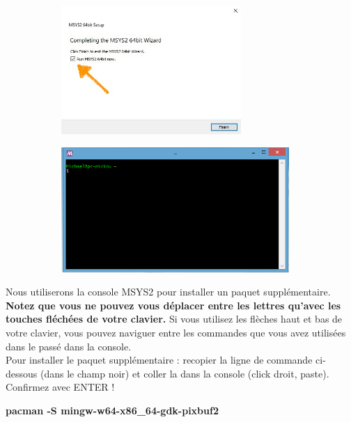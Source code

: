 \documentclass{article}
\begin{document}
\begin{figure}[H]
\begin{subfigure}[c]{0.5\textwidth}
\includegraphics[width=0.75\textwidth]{Plots/AutoInstall6.jpeg}
\end{subfigure}
\begin{subfigure}[c]{0.5\textwidth}
\includegraphics[width=0.95\textwidth]{Plots/Msys2_6Terminal.png}
\end{subfigure}
\end{figure}
Nous utiliserons la console MSYS2 pour installer un paquet supplémentaire. \textbf{Notez que vous ne pouvez vous déplacer entre les lettres qu'avec les touches fléchées de votre clavier. } Si vous utilisez les flèches haut et bas de votre clavier, vous pouvez naviguer entre les commandes que vous avez utilisées dans le passé dans la console.\\

Pour installer le paquet supplémentaire : recopier la ligne de commande ci-dessous (dans le champ noir) et coller la dans la console (click droit, paste). Confirmez avec ENTER !
\begin{tcolorbox}[width=\textwidth,colframe=Purple,colback={black},title={Ceci est la console MSYS2 Shell},outer arc=0mm,colupper=white]    
      \large\textbf{pacman -S mingw-w64-x86\_64-gdk-pixbuf2}
\end{tcolorbox}
\end{document}
